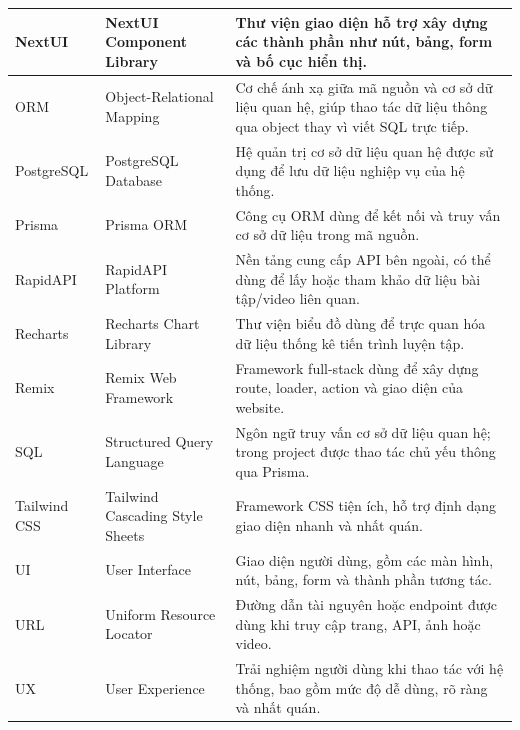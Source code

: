\begin{longtable}{|P{0.19\textwidth}|P{0.34\textwidth}|P{0.39\textwidth}|}
\hline
NextUI & NextUI Component Library & Thư viện giao diện hỗ trợ xây dựng các thành phần như nút, bảng, form và bố cục hiển thị. \\
\hline
ORM & Object-Relational Mapping & Cơ chế ánh xạ giữa mã nguồn và cơ sở dữ liệu quan hệ, giúp thao tác dữ liệu thông qua object thay vì viết SQL trực tiếp. \\
\hline
PostgreSQL & PostgreSQL Database & Hệ quản trị cơ sở dữ liệu quan hệ được sử dụng để lưu dữ liệu nghiệp vụ của hệ thống. \\
\hline
Prisma & Prisma ORM & Công cụ ORM dùng để kết nối và truy vấn cơ sở dữ liệu trong mã nguồn. \\
\hline
RapidAPI & RapidAPI Platform & Nền tảng cung cấp API bên ngoài, có thể dùng để lấy hoặc tham khảo dữ liệu bài tập/video liên quan. \\
\hline
Recharts & Recharts Chart Library & Thư viện biểu đồ dùng để trực quan hóa dữ liệu thống kê tiến trình luyện tập. \\
\hline
Remix & Remix Web Framework & Framework full-stack dùng để xây dựng route, loader, action và giao diện của website. \\
\hline
SQL & Structured Query Language & Ngôn ngữ truy vấn cơ sở dữ liệu quan hệ; trong project được thao tác chủ yếu thông qua Prisma. \\
\hline
Tailwind CSS & Tailwind Cascading Style Sheets & Framework CSS tiện ích, hỗ trợ định dạng giao diện nhanh và nhất quán. \\
\hline
UI & User Interface & Giao diện người dùng, gồm các màn hình, nút, bảng, form và thành phần tương tác. \\
\hline
URL & Uniform Resource Locator & Đường dẫn tài nguyên hoặc endpoint được dùng khi truy cập trang, API, ảnh hoặc video. \\
\hline
UX & User Experience & Trải nghiệm người dùng khi thao tác với hệ thống, bao gồm mức độ dễ dùng, rõ ràng và nhất quán. \\
\hline
\end{longtable}

